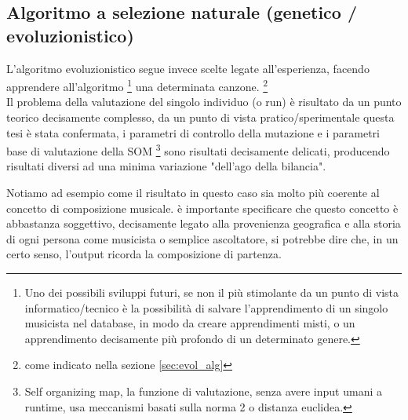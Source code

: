 \subsection{Algoritmo a selezione naturale (genetico / evoluzionistico)}

L'algoritmo evoluzionistico segue invece scelte legate all'esperienza,
facendo apprendere all'algoritmo
\footnote{Uno dei possibili sviluppi futuri, se non il più stimolante da un
punto di vista informatico/tecnico è la possibilità di salvare l'apprendimento
di un singolo musicista nel database, in modo da creare apprendimenti misti,
o un apprendimento decisamente più profondo di un determinato genere.}
una determinata canzone. \footnote{come indicato nella sezione \ref{sec:evol_alg}}
\\
Il problema della valutazione del singolo individuo (o run) è risultato da un
punto teorico decisamente complesso, da un punto di vista pratico/sperimentale
questa tesi è stata confermata, i parametri di controllo della mutazione e
i parametri base di valutazione della SOM
\footnote{Self organizing map, la funzione di valutazione,
senza avere input umani a runtime, usa meccanismi basati sulla norma 2
o distanza euclidea.}
sono risultati decisamente delicati, producendo risultati diversi ad una minima
variazione "dell'ago della bilancia".


Notiamo ad esempio come il risultato in questo caso sia molto più coerente al
concetto di composizione musicale.
è importante specificare che questo concetto è abbastanza soggettivo,
decisamente legato alla provenienza geografica e alla storia di ogni persona
come musicista o semplice ascoltatore, si potrebbe dire che, in un certo senso,
l'output ricorda la composizione di partenza.

